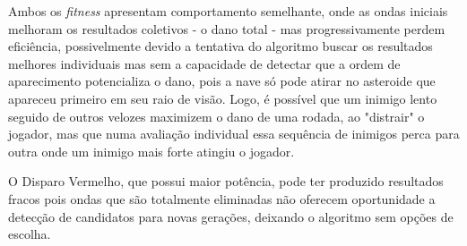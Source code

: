 Ambos os \textit{fitness} apresentam comportamento semelhante, onde as ondas iniciais melhoram os resultados coletivos - o dano total - mas progressivamente perdem eficiência, possivelmente devido a tentativa do algoritmo buscar os resultados melhores individuais mas sem a capacidade de detectar que a ordem de aparecimento potencializa o dano, pois a nave só pode atirar no asteroide que apareceu primeiro em seu raio de visão. Logo, é possível que um inimigo lento seguido de outros velozes maximizem o dano de uma rodada, ao "distrair" o jogador, mas que numa avaliação individual essa sequência de inimigos perca para outra onde um inimigo mais forte atingiu o jogador.

O Disparo Vermelho, que possui maior potência, pode ter produzido resultados fracos pois ondas que são totalmente eliminadas não oferecem oportunidade a detecção de candidatos para novas gerações, deixando o algoritmo sem opções de escolha.





